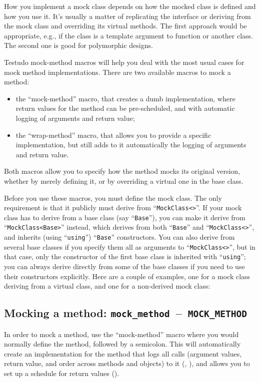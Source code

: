 \documentclass[twoside, a4paper, article]{memoir}
\newcommand*\testudocolor{\color{red!80!blue}}
\newcommand*\testudo[1]{\texttt{\testudocolor{}#1}}
\newcommand*\testudopair[2]{\testudo{#1}~--~\testudo{#2}}
\newcommand\subsectiontestudopair[3]{%
  \subsection[#1]{#1: \testudopair{#2}{#3}}}
\newcommand\typesetexample[1]{%
  \typesetexamplesource{#1}
}
\providecommand\typesetexamplesource[1]{%
}
\begin{document}
How you implement a mock class depends on how the mocked class is defined and
how you use it.  It's usually a matter of replicating the interface or deriving
from the mock class and overriding its virtual methods.  The first approach
would be appropriate, e.g., if the class is a template argument to function or
another class.  The second one is good for polymorphic designs.

Testudo mock-method macros will help you deal with the most usual cases for
mock method implementations.  There are two available macros to mock a method:
\begin{itemize}
\item the ``mock-method'' macro, that creates a dumb implementation, where
  return values for the method can be pre-scheduled, and with automatic
  logging of arguments and return value;
\item the ``wrap-method'' macro, that allows you to provide a specific
  implementation, but still adds to it automatically the logging of arguments
  and return value.
\end{itemize}
Both macros allow you to specify how the method mocks its original version,
whether by merely defining it, or by overriding a virtual one in the base
class.

Before you use these macros, you must define the mock class.  The only
requirement is that it publicly must derive from ``\texttt{MockClass<>}''.  If
your mock class has to derive from a base class (say ``\texttt{Base}''), you
can make it derive from ``\texttt{MockClass<Base>}'' instead, which derives
from both ``\texttt{Base}'' and ``\texttt{MockClass<>}'', and inherits (using
``\texttt{using}'') ``\texttt{Base}'' constructors.  You can also derive from
several base classes if you specify them all as arguments to
``\texttt{MockClass<>}'', but in that case, only the constructor of the first
base class is inherited with ``\texttt{using}''; you can always derive directly
from some of the base classes if you need to use their constructors explicitly.
Here are a couple of examples, one for a mock class deriving from a virtual
class, and one for a non-derived mock class:

\typesetexample{mock-class}

\subsectiontestudopair{Mocking a method}{mock\_method}{MOCK\_METHOD}
\label{sec:mocking-method}

In order to mock a method, use the ``mock-method'' macro where you would
normally define the method, followed by a semicolon.  This will automatically
create an implementation for the method that logs all calls (argument values,
return value, and order across methods and objects) to it
(, ), and
allows you to set up a schedule for return values
().
\end{document}
